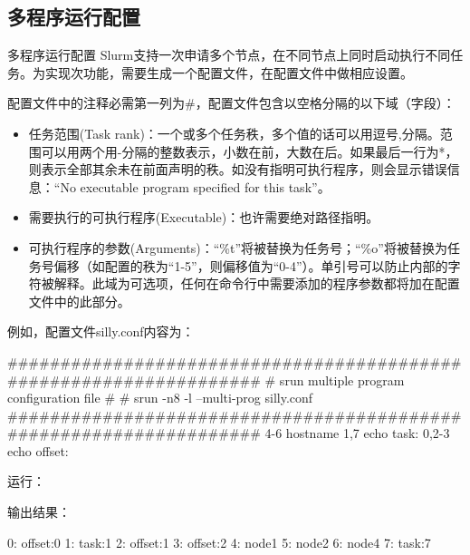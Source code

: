 \subsection{多程序运行配置}
\begin{frame}[fragile]{多程序运行配置}
Slurm支持一次申请多个节点，在不同节点上同时启动执行不同任务。为实现次功能，需要生成一个配置文件，在配置文件中做相应设置。

配置文件中的注释必需第一列为\#，配置文件包含以空格分隔的以下域（字段）：
\begin{itemize}
	\item 任务范围(Task rank)：一个或多个任务秩，多个值的话可以用逗号,分隔。范围可以用两个用-分隔的整数表示，小数在前，大数在后。如果最后一行为*，则表示全部其余未在前面声明的秩。如没有指明可执行程序，则会显示错误信息：``No executable program specified for this task''。
    \item 需要执行的可执行程序(Executable)：也许需要绝对路径指明。
    \item 可执行程序的参数(Arguments)：``\%t''将被替换为任务号；``\%o''将被替换为任务号偏移（如配置的秩为``1-5''，则偏移值为``0-4''）。单引号可以防止内部的字符被解释。此域为可选项，任何在命令行中需要添加的程序参数都将加在配置文件中的此部分。
\end{itemize}
例如，配置文件silly.conf内容为：
\begin{SH}
###################################################################
# srun multiple program configuration file
#
# srun -n8 -l --multi-prog silly.conf
###################################################################
4-6       hostname
1,7       echo  task:%
0,2-3     echo  offset:%
\end{SH}

运行：

输出结果：
\begin{OUT}
0: offset:0
1: task:1
2: offset:1
3: offset:2
4: node1
5: node2
6: node4
7: task:7
\end{OUT}
\end{frame}

